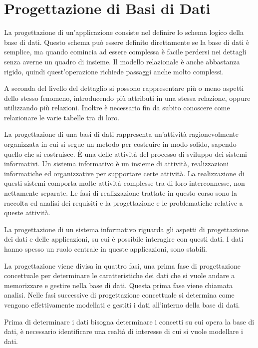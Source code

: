 \documentclass{article}
\numberwithin{equation}{subsection}
\begin{document}
\clearpage

\section{Progettazione di Basi di Dati}

La progettazione di un'applicazione consiste nel definire lo schema logico della base di dati. Questo schema può essere definito direttamente se la base di dati è 
semplice, ma quando comincia ad essere complessa è facile perdersi nei dettagli senza averne un quadro di insieme. Il modello relazionale è anche abbastanza rigido, 
quindi quest'operazione richiede passaggi anche molto complessi. 

A seconda del livello del dettaglio si possono rappresentare più o meno aspetti dello stesso fenomeno, introducendo più attributi in una stessa relazione, oppure 
utilizzando più relazioni. 
Inoltre è necessario fin da subito conoscere come relazionare le varie tabelle tra di loro. 

La progettazione di una basi di dati rappresenta un'attività ragionevolmente organizzata in cui si segue un metodo per costruire in modo solido, sapendo quello che 
si costruisce. \`{E} una delle attività del processo di sviluppo dei sistemi informativi. Un sistema informativo è un insieme di attività, realizzazioni informatiche 
ed organizzative per supportare certe attività. La realizzazione di questi sistemi comporta molte attività complesse tra di loro interconnesse, non nettamente 
separate. Le fasi di realizzazione trattate in questo corso sono la raccolta ed analisi dei requisiti e la progettazione e le problematiche relative a queste attività. 

La progettazione di un sistema informativo riguarda gli aspetti di progettazione dei dati e delle applicazioni, su cui è possibile interagire con questi dati. I dati 
hanno spesso un ruolo centrale in queste applicazioni, sono stabili. 


La progettazione viene divisa in quattro fasi, una prima fase di progettazione concettuale per determinare le caratteristiche dei dati che si vuole andare a memorizzare 
e gestire nella base di dati. Questa prima fase viene chiamata analisi. Nelle fasi successive di progettazione concettuale si determina come vengono effettivamente 
modellati e gestiti i dati all'interno della base di dati.  

Prima di determinare i dati bisogna determinare i concetti su cui opera la base di dati, è necessario identificare una realtà di interesse di cui si vuole modellare 
i dati. 
\end{document}
